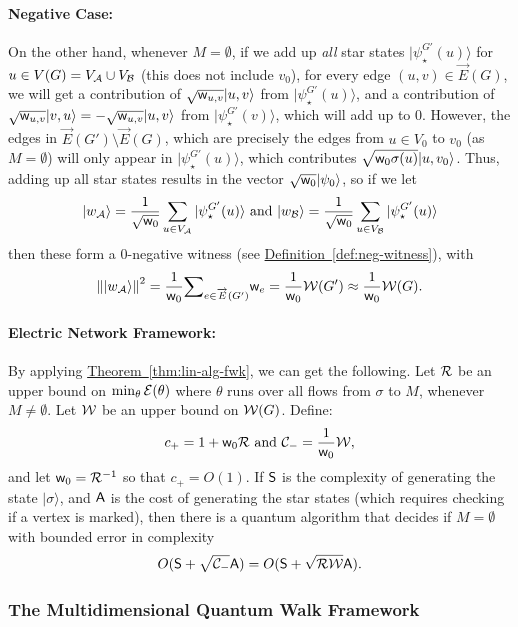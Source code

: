 \documentclass{theoretics}
\newcommand{\thm}[1]{\hyperref[thm:#1]{Theorem~\ref*{thm:#1}}}
\newcommand{\defin}[1]{\hyperref[def:#1]{Definition~\ref*{def:#1}}}
\def\ket#1{{\lvert}#1\rangle}
\renewcommand{\>}{\rangle}
\newcommand{\<}{\langle}
\renewcommand{\(}{\left(}
\renewcommand{\)}{\right)}
\def\norm#1{\left\| #1 \right\|}
\def\w{{\sf w}}
\begin{document}
\paragraph{Negative Case:} On the other hand, whenever $M=\emptyset$, if we add up \emph{all} star states $\ket{\psi_\star^{G'}(u)}$ for $u\in V(G)=V_{\cal A}\cup V_{\cal B}$ (this does not include $v_0$), for every edge $(u,v)\in \overrightarrow{E}(G)$, we will get a contribution of $\sqrt{\w_{u,v}}\ket{u,v}$ from $\ket{\psi_\star^{G'}(u)}$, and a contribution of $\sqrt{\w_{u,v}}\ket{v,u}=-\sqrt{\w_{u,v}}\ket{u,v}$ from $\ket{\psi_\star^{G'}(v)}$, which will add up to 0. However, the edges in $\overrightarrow{E}(G')\setminus\overrightarrow{E}(G)$, which are precisely the edges from $u\in V_0$ to $v_0$ (as $M=\emptyset$) will only appear in $\ket{\psi_\star^{G'}(u)}$, which contributes $\sqrt{\w_0\sigma(u)}\ket{u,v_0}$. Thus, adding up all star states results in the vector $\sqrt{\w_0}\ket{\psi_0}$, so if we let 
$$\ket{w_{\cal A}}=\frac{1}{\sqrt{\w_0}}\sum_{u\in V_{\cal A}}\ket{\psi_\star^{G'}(u)}
\mbox{ and }
\ket{w_{\cal B}}=\frac{1}{\sqrt{\w_0}}\sum_{u\in V_{\cal B}}\ket{\psi_\star^{G'}(u)}
$$
then these form a 0-negative witness (see \defin{neg-witness}), with 
$$\norm{\ket{w_{\cal A}}}^2 = \frac{1}{\w_0}\textstyle{\displaystyle\sum}_{e\in \overrightarrow{E}(G')}\w_e = \displaystyle\frac{1}{\w_0}{\cal W}(G') \approx \frac{1}{\w_0}{\cal W}(G).$$

\paragraph{Electric Network Framework:} By applying \thm{lin-alg-fwk}, we can get the following. Let 
${\cal R}$ be an upper bound on $\min_\theta {\cal E}(\theta)$ where $\theta$ runs over all flows from $\sigma$ to $M$, whenever $M\neq \emptyset$. Let ${\cal W}$ be an upper bound on ${\cal W}(G)$. Define:
$$c_+ = 1+\w_0{\cal R}
\mbox{ and }
{\cal C}_- = \frac{1}{\w_0}{\cal W},$$
and let $\w_0={\cal R}^{-1}$ so that $c_+=O(1)$. 
If ${\sf S}$ is the complexity of generating the state $\ket{\sigma}$, and ${\sf A}$ is the cost of generating the star states (which requires checking if a vertex is marked), then there is a quantum algorithm that decides if $M=\emptyset$ with bounded error in complexity 
$$O({\sf S}+\sqrt{{\cal C}_-}{\sf A}) = O({\sf S}+\sqrt{{\cal R}{\cal W}}{\sf A}).$$

\subsubsection{The Multidimensional Quantum Walk Framework}\label{sec:alternative}
\end{document}
